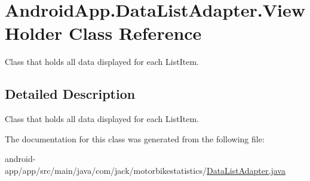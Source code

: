 \hypertarget{class_android_app_1_1_data_list_adapter_1_1_view_holder}{}\section{Android\+App.\+Data\+List\+Adapter.\+View\+Holder Class Reference}
\label{class_android_app_1_1_data_list_adapter_1_1_view_holder}


Class that holds all data displayed for each List\+Item.  




\subsection{Detailed Description}
Class that holds all data displayed for each List\+Item. 

The documentation for this class was generated from the following file\+:\begin{DoxyCompactItemize}
\item 
android-\/app/app/src/main/java/com/jack/motorbikestatistics/\hyperlink{_data_list_adapter_8java}{Data\+List\+Adapter.\+java}\end{DoxyCompactItemize}
